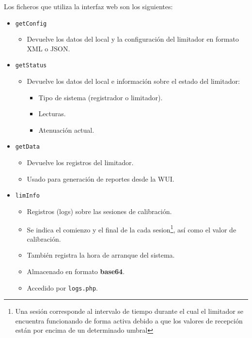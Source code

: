 Los ficheros que utiliza la interfaz web son los siguientes:
\begin{itemize} \label{list: lm7-utils}
    \item \verb|getConfig|
    \begin{itemize}
        \item Devuelve los datos del local y la configuración del limitador en formato \acrshort{XML} o \acrshort{JSON}.
    \end{itemize}

    \item \verb|getStatus|
    \begin{itemize}
        \item Devuelve los datos del local e información sobre el estado del limitador:
        \begin{itemize}
            \item Tipo de sistema (registrador o limitador).
            \item Lecturas.
            \item Atenuación actual.
        \end{itemize}
    \end{itemize}

    \item \verb|getData|
    \begin{itemize}
        \item Devuelve los registros del limitador.
        \item Usado para generación de reportes desde la WUI.
    \end{itemize}

    \item \verb|limInfo|
    \begin{itemize}
        \item Registros (logs) sobre las sesiones de calibración.
        \item Se indica el comienzo y el final de la cada \gls{sesion}\footnote{Una sesión corresponde al intervalo de tiempo durante el cual el limitador se encuentra funcionando de forma activa debido a que los valores de recepción están por encima de un determinado umbral}, así como el valor de calibración.
        \item También registra la hora de arranque del sistema.
        \item Almacenado en formato \textbf{base64}.
        \item Accedido por \verb|logs.php|.
    \end{itemize}


\end{itemize}
